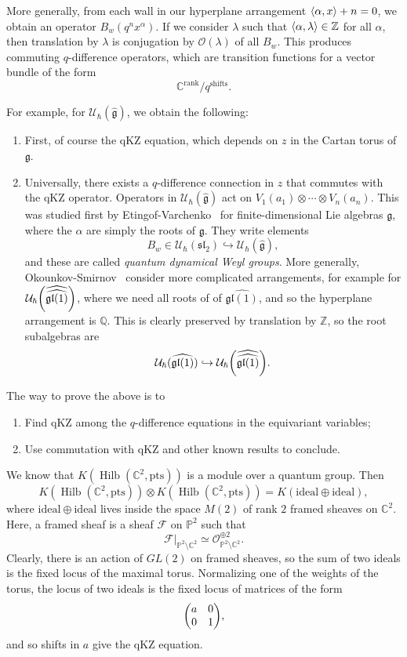 \documentclass[leqno, openany]{memoir}
\theoremstyle{definition}
\theoremstyle{remark}
\theoremstyle{plain}
\theoremstyle{definition}
\theoremstyle{remark}
\newcommand{\C}{\mathbb{C}}
\newcommand{\Z}{\mathbb{Z}}
\newcommand{\Q}{\mathbb{Q}}
\renewcommand{\P}{\mathbb{P}}
\newcommand{\g}{\mathfrak{g}}
\newcommand{\mc}[1]{\mathcal{#1}}
\newcommand{\mf}[1]{\mathfrak{#1}}
\newcommand{\mr}[1]{\mathrm{#1}}
\newcommand{\wh}[1]{\widehat{#1}}
\DeclareMathOperator{\Hilb}{Hilb}
\begin{document}
More generally, from each wall in our hyperplane arrangement $\ev{\alpha, x} + n = 0$, we obtain an operator $B_w(q^nx^{\alpha})$. If we consider $\lambda$ such that $\ev{\alpha, \lambda} \in \Z$ for all $\alpha$, then translation by $\lambda$ is conjugation by $\mc{O}(\lambda)$ of all $B_w$. This produces commuting $q$-difference operators, which are transition functions for a vector bundle of the form
\[ \C^{\mr{rank}} / q^{\mr{shifts}}. \]

For example, for $\mc{U}_{\hslash}(\wh{\mf{g}})$, we obtain the following:
\begin{enumerate}
    \item First, of course the qKZ equation, which depends on $z$ in the Cartan torus of $\mf{g}$.
    \item Universally, there exists a $q$-difference connection in $z$ that commutes with the qKZ operator. Operators in $\mc{U}_{\hslash}(\wh{\mf{g}})$ act on $V_1(a_1) \otimes \cdots \otimes V_n(a_n)$. This was studied first by Etingof-Varchenko~\cite{etvar} for finite-dimensional Lie algebras $\g$, where the $\alpha$ are simply the roots of $\mf{g}$. They write elements
        \[ B_w \in \mc{U}_{\hbar}(\mf{sl}_2) \hookrightarrow \mc{U}_{\hslash}(\wh{\g}), \]
        and these are called \textit{quantum dynamical Weyl groups}. More generally, Okounkov-Smirnov~\cite{qdenak} consider more complicated arrangements, for example for $\mc{U}_{\hslash}\qty(\wh{\wh{\mf{gl}(1)}})$, where we need all roots of of $\wh{\mf{gl}(1)}$, and so the hyperplane arrangement is $\Q$. This is clearly preserved by translation by $\Z$, so the root subalgebras are
        \[ \mc{U}_{\hslash}(\wh{\mf{gl}(1)}) \hookrightarrow \mc{U}_{\hslash}\qty(\wh{\wh{\mf{gl}(1)}}). \]
\end{enumerate}

The way to prove the above is to
\begin{enumerate}
    \item Find qKZ among the $q$-difference equations in the equivariant variables;
    \item Use commutation with qKZ and other known results to conclude.
\end{enumerate}

We know that $K(\Hilb(\C^2, \mr{pts}))$ is a module over a quantum group. Then
\[ K(\Hilb(\C^2, \mr{pts})) \otimes K(\Hilb(\C^2, \mr{pts})) = K(\mr{ideal} \oplus \mr{ideal}), \]
where $\mr{ideal} \oplus \mr{ideal}$ lives inside the space $M(2)$ of rank $2$ framed sheaves on $\C^2$. Here, a framed sheaf is a sheaf $\mc{F}$ on $\P^2$ such that 
\[ \mc{F}|_{\P^2 \setminus \C^2} \simeq \mc{O}_{\P^2\setminus \C^2}^{\oplus 2}. \]
Clearly, there is an action of $GL(2)$ on framed sheaves, so the sum of two ideals is the fixed locus of the maximal torus. Normalizing one of the weights of the torus, the locus of two ideals is the fixed locus of matrices of the form
\[ \mqty(a & 0 \\ 0 & 1), \]
and so shifts in $a$ give the qKZ equation.
\end{document}
